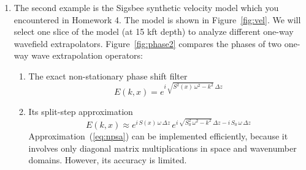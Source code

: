 \begin{enumerate}


\lstset{language=python,numbers=left,numberstyle=\tiny,showstringspaces=false}


\lstset{language=c,numbers=left,numberstyle=\tiny,showstringspaces=false}


\newpage

\item The second example is the Sigsbee synthetic velocity model which
  you encountered in Homework 4. The model is shown in
  Figure~\ref{fig:vel}. We will select one slice of the model (at 15
  kft depth) to analyze different one-way wavefield
  extrapolators. Figure~\ref{fig:phase2} compares the phases of two one-way wave
  extrapolation operators:
  \begin{enumerate}
  \item The exact non-stationary phase shift filter
    \begin{equation}
      \label{eq:nps}
      E(k,x) = e^{i\,\sqrt{S^2(x)\,\omega^2 - k^2}\,\Delta z}
    \end{equation}
  \item Its split-step approximation
    \begin{equation}
      \label{eq:npsa}
      E(k,x) \approx e^{i\,S(x)\,\omega\,\Delta z}\,e^{i\,\sqrt{S_0^2\,\omega^2 - k^2}\,\Delta z-i\,S_0\,\omega\,\Delta z}
    \end{equation}
    Approximation~(\ref{eq:npsa}) can be implemented efficiently, because it involves
    only diagonal matrix multiplications in space and wavenumber domains. However, its accuracy is limited.
  \end{enumerate}   
  

\end{enumerate}
